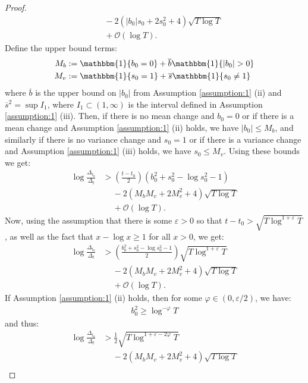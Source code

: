 \documentclass{article}
\begin{document}
\begin{proof}
\begin{align*}
    &\quad\: - 2 \left(|b_0|s_0 +2s_0^2 + 4\right) \sqrt{T \log T} \\
    &\quad\: + \mathcal{O}(\log T).
\end{align*}
Define the upper bound terms:
\begin{align*}
    M_b &:= \mathbbm{1}\{b_0 = 0\} + \overline{b}\mathbbm{1}\{|b_0| > 0\} \\
    M_v &:= \mathbbm{1}\{s_0 = 1\} + \overline{s}\mathbbm{1}\{s_0 \neq 1\} 
\end{align*}
where $\overline{b}$ is the upper bound on $|b_0|$ from Assumption \ref{assumption:1} (ii) and $\overline{s}^2 = \sup I_1$, where $I_1 \subset (1, \infty)$ is the interval defined in Assumption \ref{assumption:1} (iii). Then, if there is no mean change and $b_0 =0$ or if there is a mean change and Assumption \ref{assumption:1} (ii) holds, we have $|b_0| \leq M_b$, and similarly if there is no variance change and $s_0 =1$ or if there is a variance change and Assumption \ref{assumption:1} (iii) holds, we have $s_0 \leq M_v$. Using these bounds we get:
\begin{align*}
    \log \frac{\Delta_{t_0}}{\Delta_t} &> \left(\frac{t-t_0}{2}\right)(b_0^2 + s_0^2 - \log s_0^2 - 1) \\
    &\quad\: - 2 \left(M_bM_v +2M_v^2 + 4\right) \sqrt{T \log T} \\
    &\quad\: + \mathcal{O}(\log T).
\end{align*}
Now, using the assumption that there is some $\varepsilon >0$ so that $t-t_0 > \sqrt{T\log^{1+\varepsilon} T}$, as well as the fact that $x - \log x \geq 1$ for all $x > 0$, we get: 
\begin{align*}
    \log \frac{\Delta_{t_0}}{\Delta_t} &>  \left(\frac{b_0^2 + s_0^2 - \log s_0^2 - 1}{2}\right)\sqrt{T\log^{1+\varepsilon} T} \\
    &\quad\: - 2 \left(M_bM_v +2M_v^2 + 4\right) \sqrt{T \log T} \\
    &\quad\: + \mathcal{O}(\log T).
\end{align*}
If Assumption \ref{assumption:1} (ii) holds, then for some $\varphi \in (0, \varepsilon / 2)$, we have:
\begin{align*}
    b_0^2 \geq \log^{-\varphi} T
\end{align*}
and thus: 
\begin{align*}
    \log \frac{\Delta_{t_0}}{\Delta_t} &>  \frac{1}{2}\sqrt{T\log^{1+\varepsilon - 2\varphi} T} \\
    &\quad\: - 2 \left(M_bM_v +2M_v^2 + 4 \right) \sqrt{T \log T} \\

\end{align*}
\end{proof}
\end{document}

